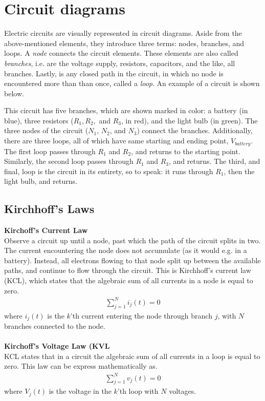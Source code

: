 \section{Circuit diagrams}
Electric circuits are visually represented in circuit diagrams. Aside from the above-mentioned elements, they introduce three terms: nodes, branches, and loops. A \textit{node} connects the circuit elements. These elements are also called \textit{branches}, i.e. are the voltage supply, resistors, capacitors, and the like, all branches. Lastly, is any closed path in the circuit, in which no node is encountered more than than once, called a \textit{loop}\cite[page~32]{bcircuit}. An example of a circuit is shown below.

\begin{figure}[H]
 
\end{figure}

This circuit has five branches, which are shown marked in color: a battery (in blue), three resistors ($R_1, R_2,$ and $R_3$, in red), and the light bulb (in green). The three nodes of the circuit ($N_1$, $N_2$, and $N_3$) connect the branches. Additionally, there are three loops, all of which have same starting and ending point, $V_{battery}$. The first loop passes through $R_1$ and $R_2$, and returns to the starting point. Similarly, the second loop passes through $R_1$ and $R_3$, and returns. The third, and final, loop is the circuit in its entirety, so to speak: it runs through $R_1$, then the light bulb, and returns. 

\subsection{Kirchhoff's Laws}
\textbf{Kirchoff's Current Law}
\\
Observe a circuit up until a node, past which the path of the circuit splits in two. The current encountering the node does not accumulate (as it would e.g. in a battery). Instead, all electrons flowing to that node split up between the available paths, and continue to flow through the circuit. This is Kirchhoff’s current law (KCL), which states that the algebraic sum of all currents in a node is equal to zero. 
\begin{align}
\sum_{j=1}^{N} i_{j}(t) = 0
\end{align}
where $i_{j}(t)$ is the $k$'th current entering the node through branch $j$, with $N$ branches connected to the node.\cite[page~32]{bcircuit}
\\
\\
\textbf{Kirchoff's Voltage Law (KVL}
\\
KCL states that in a circuit the algebraic sum of all currents in a loop is equal to zero. This law can be express mathematically  as.
\begin{align}
\sum_{j=1}^{N} v_{j}(t) = 0
\end{align}
where $V_{j}(t)$ is the voltage in the $k$'th loop with $N$ voltages.\citep[page~34]{bcircuit}\\

